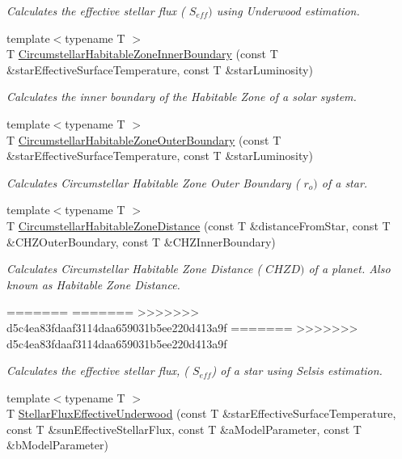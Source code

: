 \begin{DoxyCompactItemize}
\begin{DoxyCompactList}\small\item\em Calculates the effective stellar flux ( $S_{eff})$ using Underwood estimation. \end{DoxyCompactList}\item 
{\footnotesize template$<$typename T $>$ }\\T \hyperlink{group___astrophysics_ga9ee2e8023cb444aa4638c962788b5853}{Circumstellar\+Habitable\+Zone\+Inner\+Boundary} (const T \&star\+Effective\+Surface\+Temperature, const T \&star\+Luminosity)
\begin{DoxyCompactList}\small\item\em Calculates the inner boundary of the Habitable Zone of a solar system. \end{DoxyCompactList}\item 
{\footnotesize template$<$typename T $>$ }\\T \hyperlink{group___astrophysics_gaa47fcde814ba8007de800e930fc0a08d}{Circumstellar\+Habitable\+Zone\+Outer\+Boundary} (const T \&star\+Effective\+Surface\+Temperature, const T \&star\+Luminosity)
\begin{DoxyCompactList}\small\item\em Calculates Circumstellar Habitable Zone Outer Boundary ( $r_o)$ of a star. \end{DoxyCompactList}\item 
{\footnotesize template$<$typename T $>$ }\\T \hyperlink{group___astrophysics_gacf3a720793cdb27f6d93b170b44e81be}{Circumstellar\+Habitable\+Zone\+Distance} (const T \&distance\+From\+Star, const T \&C\+H\+Z\+Outer\+Boundary, const T \&C\+H\+Z\+Inner\+Boundary)
\begin{DoxyCompactList}\small\item\em Calculates Circumstellar Habitable Zone Distance ( $CHZD)$ of a planet. Also known as Habitable Zone Distance. \end{DoxyCompactList}\item 
=======
=======
>>>>>>> d5c4ea83fdaaf3114daa659031b5ee220d413a9f
=======
>>>>>>> d5c4ea83fdaaf3114daa659031b5ee220d413a9f
\begin{DoxyCompactList}\small\item\em Calculates the effective stellar flux, ( $S_{eff}$) of a star using Selsis estimation. \end{DoxyCompactList}\item 
{\footnotesize template$<$typename T $>$ }\\T \hyperlink{group___astrophysics_ga34d1e39bce17904bc6d383f1935c79d6}{Stellar\+Flux\+Effective\+Underwood} (const T \&star\+Effective\+Surface\+Temperature, const T \&sun\+Effective\+Stellar\+Flux, const T \&a\+Model\+Parameter, const T \&b\+Model\+Parameter)

\end{DoxyCompactItemize}
